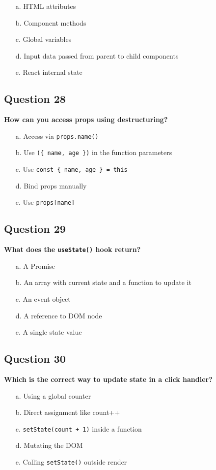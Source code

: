 \documentclass{article}
\begin{document}
\begin{itemize}
  \item[a.] HTML attributes
  \item[b.] Component methods
  \item[c.] Global variables
  \item[d.] Input data passed from parent to child components
  \item[e.] React internal state
\end{itemize}

\subsection*{Question 28}
\textbf{How can you access props using destructuring?}

\begin{itemize}
  \item[a.] Access via \texttt{props.name()}
  \item[b.] Use \texttt{(\{ name, age \})} in the function parameters
  \item[c.] Use \texttt{const \{ name, age \} = this}
  \item[d.] Bind props manually
  \item[e.] Use \texttt{props[name]}
\end{itemize}

\subsection*{Question 29}
\textbf{What does the \texttt{useState()} hook return?}

\begin{itemize}
  \item[a.] A Promise
  \item[b.] An array with current state and a function to update it
  \item[c.] An event object
  \item[d.] A reference to DOM node
  \item[e.] A single state value
\end{itemize}

\subsection*{Question 30}
\textbf{Which is the correct way to update state in a click handler?}

\begin{itemize}
  \item[a.] Using a global counter
  \item[b.] Direct assignment like count++
  \item[c.] \texttt{setState(count + 1)} inside a function
  \item[d.] Mutating the DOM
  \item[e.] Calling \texttt{setState()} outside render
\end{itemize}
\end{document}
